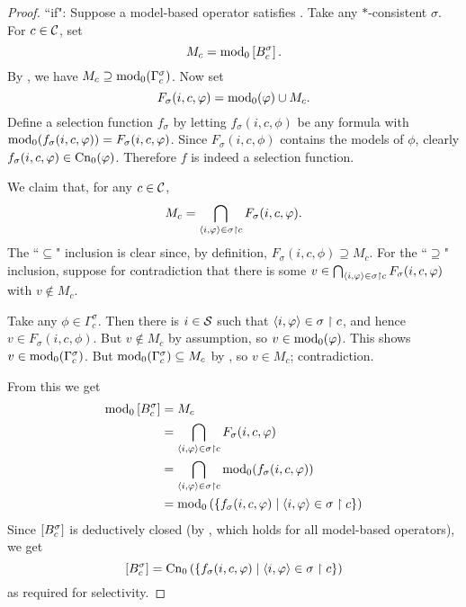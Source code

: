 \begin{proof}
    ``if": Suppose a model-based operator satisfies \boundedness{}. Take any
    $\ast$-consistent $\sigma$. For $c \in \C$, set
    \[
        M_c = \propmods\proppart{B^\sigma_c}.
    \]
    By \boundedness{}, we have $M_c \supseteq \propmods(\Gamma^\sigma_c)$. Now
    set
    \[
        F_\sigma(i, c, \phi) = \propmods(\phi) \cup M_c.
    \]
    Define a selection function $f_\sigma$ by letting $f_\sigma(i, c, \phi)$ be
    any formula with $\propmods(f_\sigma(i,c, \phi)) = F_\sigma(i, c, \phi)$.
    Since $F_\sigma(i, c, \phi)$ contains the models of $\phi$, clearly
    $f_\sigma(i, c, \phi) \in \cnprop(\phi)$. Therefore $f$ is indeed a
    selection function.

    We claim that, for any $c \in \C$,
    \[
        M_c
        = \bigcap_{\tuple{i, \phi} \in \sigma \rs c}{
            F_\sigma(i, c, \phi)
        }.
    \]
    The ``$\subseteq$" inclusion is clear since, by definition, $F_\sigma(i, c,
    \phi) \supseteq M_c$. For the ``$\supseteq$" inclusion, suppose for
    contradiction that there is some $v \in \bigcap_{\tuple{i, \phi} \in \sigma
    \rs c}{F_\sigma(i, c, \phi)}$ with $v \notin M_c$.

    Take any $\phi \in \Gamma^\sigma_c$. Then there is $i \in \S$ such that
    $\tuple{i, \phi} \in \sigma \rs c$, and hence $v \in F_\sigma(i, c, \phi)$.
    But $v \notin M_c$ by assumption, so $v \in \propmods(\phi)$. This shows $v
    \in \propmods(\Gamma^\sigma_c)$. But $\propmods(\Gamma^\sigma_c) \subseteq
    M_c$ by \boundedness{}, so $v \in M_c$; contradiction.

    From this we get
    \begin{align*}
        \propmods\proppart{B^\sigma_c}
        &= M_c \\
        &= \bigcap_{\tuple{i, \phi} \in \sigma \rs c}{F_\sigma(i, c, \phi)} \\
        &= \bigcap_{\tuple{i, \phi} \in \sigma \rs c}{
            \propmods(f_\sigma(i, c, \phi))
        } \\
        &= \propmods\left(\{
            f_\sigma(i, c, \phi) \mid \tuple{i, \phi} \in \sigma \rs c
        \}\right)
    \end{align*}
    Since $\proppart{B^\sigma_c}$ is deductively closed (by \closure{}, which
    holds for all model-based operators), we get
    \[
        \proppart{B^\sigma_c}
        =
        \cnprop\left(\{
            f_\sigma(i, c, \phi) \mid \tuple{i, \phi} \in \sigma \rs c
        \}\right)
    \]
    as required for selectivity.


\end{proof}
